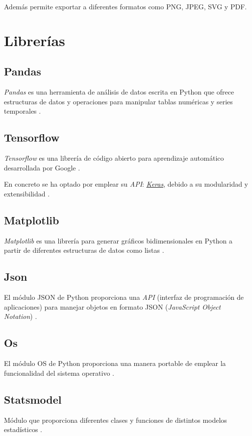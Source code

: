 Además permite exportar a diferentes formatos como PNG, JPEG, SVG y PDF.

\section{Librerías}
\subsection{Pandas}
\textit{Pandas} es una herramienta de análisis de datos escrita en Python que ofrece estructuras 
de datos y operaciones para manipular tablas numéricas y series temporales 
\cite{eswiki:pandas2023}.

\subsection{Tensorflow}
\textit{Tensorflow} es una librería de código abierto para aprendizaje automático desarrollada
por Google \cite{eswiki:tensorflow2021}.

En concreto se ha optado por emplear su \textit{API}: \href{https://keras.io/}{\textit{Keras}}, 
debido a su modularidad y extensibilidad \cite{eswiki:keras2022}.

\subsection{Matplotlib}
\textit{Matplotlib} es una librería para generar gráficos bidimensionales en Python a partir de 
diferentes estructuras de datos como listas \cite{eswiki:matplotlib2022}.

\subsection{Json}
El módulo JSON de Python proporciona una \textit{API} (interfaz de programación de 
aplicaciones) para manejar objetos en formato JSON (\textit{JavaScript Object 
Notation}) \cite{python:json2023}.

\subsection{Os}
El módulo OS de Python proporciona una manera portable de emplear la funcionalidad del
sistema operativo \cite{python:os2023}.

\subsection{Statsmodel}
Módulo que proporciona diferentes clases y funciones de distintos modelos estadísticos \cite{misc:perktold2023}.


